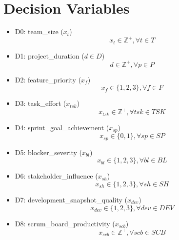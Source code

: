 \documentclass{article}
\begin{document}
\section{Decision Variables}
\begin{itemize}
    \item D0: team\_size ($x_{t}$)
        \begin{equation*}
            x_{t} \in \mathbb{Z}^{+}, \forall t \in T
        \end{equation*}
    \item D1: project\_duration ($d \in D$)
        \begin{equation*}
            d \in \mathbb{Z}^{+}, \forall p \in P
        \end{equation*}
    \item D2: feature\_priority ($x_{f}$)
        \begin{equation*}
            x_{f} \in \{1, 2, 3\}, \forall f \in F
        \end{equation*}
    \item D3: task\_effort ($x_{tsk}$)
        \begin{equation*}
            x_{tsk} \in \mathbb{Z}^{+}, \forall tsk \in TSK
        \end{equation*}
    \item D4: sprint\_goal\_achievement ($x_{sp}$)
        \begin{equation*}
            x_{sp} \in \{0, 1\}, \forall sp \in SP
        \end{equation*}
    \item D5: blocker\_severity ($x_{bl}$)
        \begin{equation*}
            x_{bl} \in \{1, 2, 3\}, \forall bl \in BL
        \end{equation*}
    \item D6: stakeholder\_influence ($x_{sh}$)
        \begin{equation*}
            x_{sh} \in \{1, 2, 3\}, \forall sh \in SH
        \end{equation*}
    \item D7: development\_snapshot\_quality ($x_{dev}$)
        \begin{equation*}
            x_{dev} \in \{1, 2, 3\}, \forall dev \in DEV
        \end{equation*}
    \item D8: scrum\_board\_productivity ($x_{scb}$)
        \begin{equation*}
            x_{scb} \in \mathbb{Z}^{+}, \forall scb \in SCB

\end{equation*}
\end{itemize}
\end{document}
